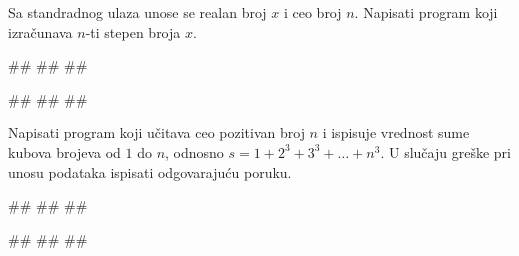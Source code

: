 \begin{Exercise}[label=p1.3_09]
 Sa standradnog ulaza unose se realan broj $x$ i ceo broj
 $n$. Napisati program koji izračunava $n$-ti stepen broja $x$. 
 
\begin{miditest}
\begin{upotreba}{1}
#\naslovInt#
##
##
\end{upotreba}
\end{miditest}
\begin{miditest}
\begin{upotreba}{2}
#\naslovInt#
##
##
\end{upotreba}
\end{miditest}
\end{Exercise}
\begin{Answer}[ref=p1.3_09]
\end{Answer}


\begin{Exercise}[label=v1.3_13] 
Napisati program koji učitava ceo pozitivan broj $n$ i ispisuje
vrednost sume kubova brojeva od $1$ do $n$, odnosno $s = 1+2^3+3^3+
\ldots +n^3$. U slučaju greške pri unosu podataka ispisati
odgovarajuću poruku. \\
\begin{miditest}
\begin{upotreba}{1}
#\naslovInt#
##
##
\end{upotreba}
\end{miditest}
\begin{miditest}
\begin{upotreba}{2}
#\naslovInt#
##
##
\end{upotreba}
\end{miditest}
\end{Exercise}
\begin{Answer}[ref=v1.3_13]
\end{Answer}

